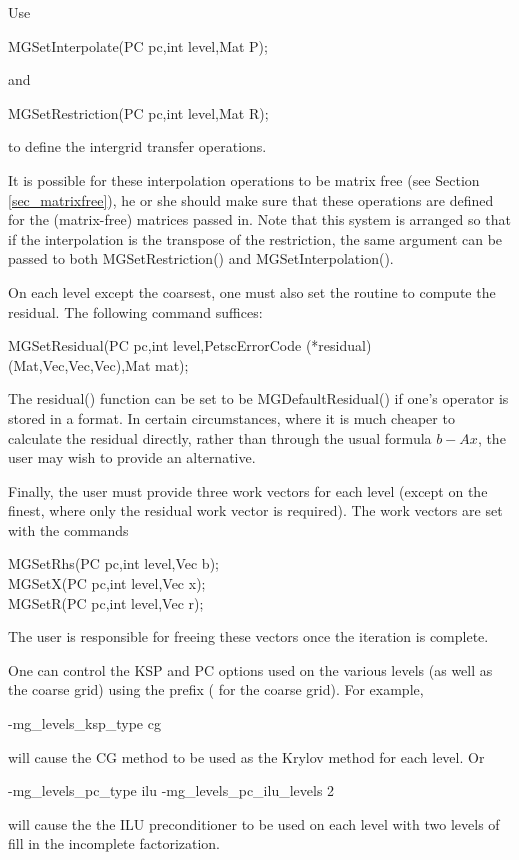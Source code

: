 Use
\begin{tabbing}
  MGSetInterpolate(PC pc,int level,Mat P);
\end{tabbing}
and
\begin{tabbing}
  MGSetRestriction(PC pc,int level,Mat R);
\end{tabbing}
to define the intergrid transfer operations.

It is possible for these interpolation operations to be matrix free
(see Section \ref{sec_matrixfree}),
he or she should make sure that these operations are defined for the (matrix-free) matrices
passed in. 
Note that this system is arranged so that if the interpolation is 
the transpose of the restriction, the same  argument can be 
passed to both MGSetRestriction() and MGSetInterpolation().

On each level except the coarsest, one must also set the routine to 
compute the residual.  The following command suffices: 
\begin{tabbing}
   MGSetResidual(PC pc,int level,PetscErrorCode (*residual)(Mat,Vec,Vec,Vec),Mat mat);
\end{tabbing}
The residual() function can be set to be MGDefaultResidual()
if 
one's operator is stored in a  format.  In certain circumstances, 
where it is much cheaper to calculate the residual directly, rather 
than through the usual formula $b - Ax$,  the user may wish to provide 
an alternative. 

Finally, the user must provide three work vectors for each level 
(except on the finest, where only the residual work vector is required).
The work vectors are set with the 
commands    
\begin{tabbing}
  MGSetRhs(PC pc,int level,Vec b);\\
  MGSetX(PC pc,int level,Vec x);\\
  MGSetR(PC pc,int level,Vec r);
\end{tabbing}

The user is responsible for freeing these vectors once the iteration 
is complete.

One can control the KSP and PC options used on the various levels
(as well as the coarse grid) using the prefix  
( for the coarse grid).
 For example,
\begin{tabbing}
  -mg\_levels\_ksp\_type cg
\end{tabbing}
will cause the CG method to be used as the Krylov method for each level.
Or
\begin{tabbing}
  -mg\_levels\_pc\_type ilu -mg\_levels\_pc\_ilu\_levels 2
\end{tabbing}
will cause the the ILU preconditioner to be used on each level with 
two levels of fill in the incomplete factorization.

